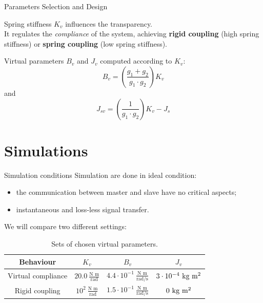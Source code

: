 \documentclass[10pt]{beamer}
\begin{document}
\begin{frame}{Parameters Selection and Design}
	
Spring stiffness $ K_{v} $ influences the transparency.\\
\bigskip
It regulates the \textit{compliance} of the system, achieving \textbf{rigid coupling} (high spring stiffness) or \textbf{spring coupling} (low spring stiffness).\\
\bigskip
\pause
{\centering
{}\par}
\pause

\bigskip
Virtual parameters $ B_{v} $ and $J_{v} $ computed according to $ K_{v} $:
\begin{equation*}
	B_v = \left(\frac{g_1 + g_2}{g_1 \cdot g_2}\right) K_v
\end{equation*}
and
\begin{equation*}
	J_{sv} = \left(\frac{1}{g_1 \cdot g_2}\right) K_v - J_s
\end{equation*}

\end{frame}	



\section{Simulations}

\begin{frame}{Simulation conditions}
	Simulation are done in ideal condition:
	\begin{itemize}
		\item the communication between master and slave have no critical aspects;
		\item instantaneous and loss-less signal transfer.
	\end{itemize}
	
	We will compare two different settings:
	\begin{table}[H]
		\centering
		\begin{tabular}{c c c c}
			\toprule
			Behaviour & $K_{v}$ & $B_{v}$ &  $J_{v}$\\
			\midrule 
			\midrule 
			Virtual compliance& $20.0 \ \frac{\text{N m}}{\text{rad}} $ & $4.4\cdot 10^{-1} \ \frac{\text{N m}}{\text{rad/s}}$ & $3\cdot 10^{-4} \ \text{kg m\textsuperscript{2}}$\\
			Rigid coupling & $10^{2} \ \frac{\text{N m}}{\text{rad}} $ & $1.5\cdot 10^{-1} \ \frac{\text{N m}}{\text{rad/s}}$ & $ 0 \ \text{kg m\textsuperscript{2}} $\\
			\bottomrule
		\end{tabular}
		\caption{Sets of chosen virtual parameters.}
		\label{virtParams}
	\end{table}

\end{frame}
\end{document}

